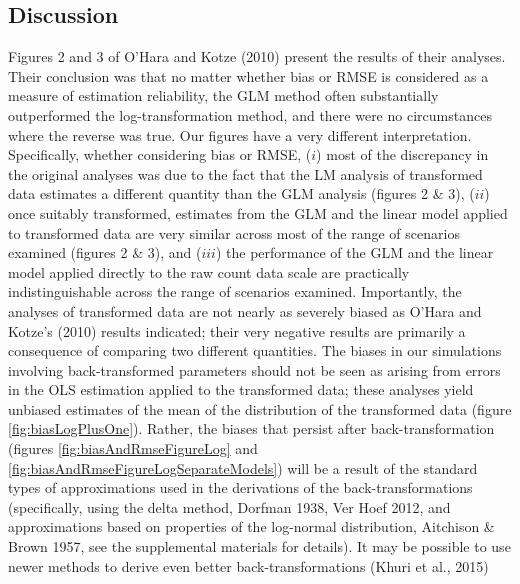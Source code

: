 \documentclass[]{article}
\begin{document}
\subsection{Discussion}\label{discussion}

Figures 2 and 3 of O'Hara and Kotze (2010) present the results of their
analyses. Their conclusion was that no matter whether bias or RMSE is
considered as a measure of estimation reliability, the GLM method often
substantially outperformed the log-transformation method, and there were
no circumstances where the reverse was true. Our figures have a very
different interpretation. Specifically, whether considering bias or
RMSE, (\(i\)) most of the discrepancy in the original analyses was due
to the fact that the LM analysis of transformed data estimates a
different quantity than the GLM analysis (figures 2 \& 3), (\(ii\)) once
suitably transformed, estimates from the GLM and the linear model
applied to transformed data are very similar across most of the range of
scenarios examined (figures 2 \& 3), and (\(iii\)) the performance of
the GLM and the linear model applied directly to the raw count data
scale are practically indistinguishable across the range of scenarios
examined. Importantly, the analyses of transformed data are not nearly
as severely biased as O'Hara and Kotze's (2010) results indicated; their
very negative results are primarily a consequence of comparing two
different quantities. The biases in our simulations involving
back-transformed parameters should not be seen as arising from errors in
the OLS estimation applied to the transformed data; these analyses yield
unbiased estimates of the mean of the distribution of the transformed
data (figure \ref{fig:biasLogPlusOne}). Rather, the biases that persist
after back-transformation (figures \ref{fig:biasAndRmseFigureLog} and
\ref{fig:biasAndRmseFigureLogSeparateModels}) will be a result of the
standard types of approximations used in the derivations of the
back-transformations (specifically, using the delta method, Dorfman
1938, Ver Hoef 2012, and approximations based on properties of the
log-normal distribution, Aitchison \& Brown 1957, see the supplemental
materials for details). It may be possible to use newer methods to
derive even better back-transformations (Khuri et al., 2015)
\end{document}
